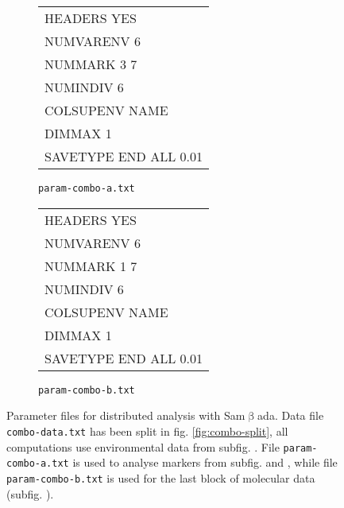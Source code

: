 \documentclass[a4paper,11pt]{article}
\newcommand{\smb}{\textsf{Sam$\upbeta$ada}}
\begin{document}
\begin{figure}[htbp]
\centering

\hfill%
\begin{subfigure}{6cm}
\centering
\ttfamily
\begin{tabular}{|l|}
\hline
HEADERS YES\\	
NUMVARENV 6\\	
NUMMARK 3 7	\\
NUMINDIV 6\\
COLSUPENV NAME\\
DIMMAX 1\\
SAVETYPE END ALL 0.01\\
\hline
\end{tabular}%
\caption{\texttt{param-combo-a.txt}}
\label{fig:fichier-param-parallele-combo-a}
\end{subfigure}%
\hfill%
\begin{subfigure}{6cm}
\centering
\ttfamily
\begin{tabular}{|l|}
\hline
HEADERS YES\\	
NUMVARENV 6\\	
NUMMARK 1 7	\\
NUMINDIV 6\\
COLSUPENV NAME\\
DIMMAX 1\\
SAVETYPE END ALL 0.01\\
\hline
\end{tabular}%
\caption{\texttt{param-combo-b.txt}}
\label{fig:fichier-param-parallele-combo-b}
\end{subfigure}%
\hfill

\caption[Exemple de fichier de paramètres pour \smb.]
{
	Parameter files for distributed analysis with \smb.
	Data file \texttt{combo-data.txt} has been split in fig. \ref{fig:combo-split}, all computations use environmental data from subfig. \emph{}.
	File \texttt{param-combo-a.txt} is used to analyse markers from subfig. \emph{} and \emph{}, while file \texttt{param-combo-b.txt} is used for the last block of molecular data (subfig. \emph{}).
}
\label{fig:fichier-param-parallele-combo}
\end{figure}
\end{document}

